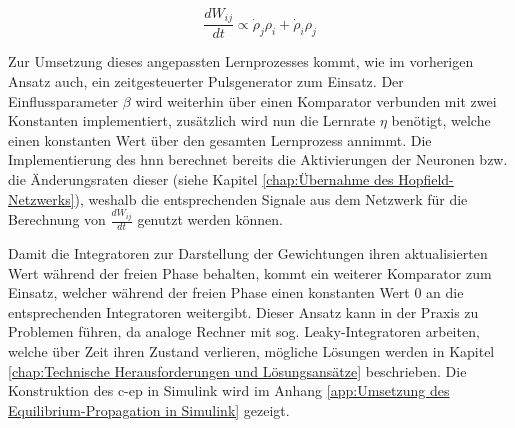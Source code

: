 \[\frac{dW_{ij}}{dt}\propto\dot{\rho}_j\rho_i+\dot{\rho}_i\rho_j\]

Zur Umsetzung dieses angepassten Lernprozesses kommt, wie im vorherigen Ansatz auch, ein zeitgesteuerter Pulsgenerator zum Einsatz. Der Einflussparameter \(\beta\) wird weiterhin über einen Komparator verbunden mit zwei Konstanten implementiert, zusätzlich wird nun die Lernrate \(\eta\) benötigt, welche einen konstanten Wert über den gesamten Lernprozess annimmt. Die Implementierung des \ac{hnn} berechnet bereits die Aktivierungen der Neuronen bzw. die Änderungsraten dieser (siehe Kapitel \ref{chap:Übernahme des Hopfield-Netzwerks}), weshalb die entsprechenden Signale aus dem Netzwerk für die Berechnung von \(\frac{dW_{ij}}{dt}\) genutzt werden können.

Damit die Integratoren zur Darstellung der Gewichtungen ihren aktualisierten Wert während der freien Phase behalten, kommt ein weiterer Komparator zum Einsatz, welcher während der freien Phase einen konstanten Wert \(0\) an die entsprechenden Integratoren weitergibt. Dieser Ansatz kann in der Praxis zu Problemen führen, da analoge Rechner mit sog. Leaky-Integratoren arbeiten, welche über Zeit ihren Zustand verlieren, mögliche Lösungen werden in Kapitel \ref{chap:Technische Herausforderungen und Lösungsansätze} beschrieben. Die Konstruktion des \ac{c-ep} in Simulink wird im Anhang \ref{app:Umsetzung des Equilibrium-Propagation in Simulink} gezeigt.
